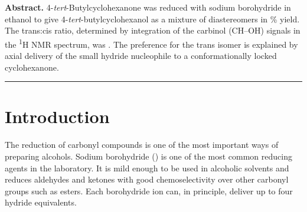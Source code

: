 \documentclass[11pt,a4paper]{article}
\begin{document}


\noindent\textbf{Abstract.} 4-\emph{tert}-Butylcyclohexanone was reduced with sodium borohydride in ethanol to give 4-\emph{tert}-butylcyclohexanol as a mixture of diastereomers in \% yield. The trans:cis ratio, determined by integration of the carbinol (CH--OH) signals in the \textsuperscript{1}H NMR spectrum, was . The preference for the trans isomer is explained by axial delivery of the small hydride nucleophile to a conformationally locked cyclohexanone.

\noindent\rule{\linewidth}{0.6pt}

\section{Introduction}

The reduction of carbonyl compounds is one of the most important ways of preparing alcohols. Sodium borohydride () is one of the most common reducing agents in the laboratory. It is mild enough to be used in alcoholic solvents and reduces aldehydes and ketones with good chemoselectivity over other carbonyl groups such as esters.\cite{Manual2026,Clayden2012} Each borohydride ion can, in principle, deliver up to four hydride equivalents.
\end{document}
